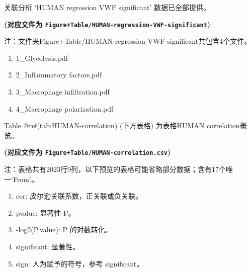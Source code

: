 \documentclass[
  ignorenonframetext,
]{beamer}
\providecommand{\tightlist}{%
  \setlength{\itemsep}{0pt}\setlength{\parskip}{0pt}}
\begin{document}
\begin{frame}[fragile]{关联分析}
`HUMAN regression VWF significant' 数据已全部提供。

\textbf{(对应文件为
\texttt{Figure+Table/HUMAN-regression-VWF-significant})}

\begin{center}\begin{tcolorbox}[colback=gray!10, colframe=gray!50, width=0.9\linewidth, arc=1mm, boxrule=0.5pt]注：文件夹Figure+Table/HUMAN-regression-VWF-significant共包含4个文件。

\begin{enumerate}\tightlist
\item 1\_Glycolysis.pdf
\item 2\_Inflammatory factors.pdf
\item 3\_Macrophage infiltration.pdf
\item 4\_Macrophage polarization.pdf
\end{enumerate}\end{tcolorbox}
\end{center}

\begin{center}\vspace{1.5cm}\end{center}

\begin{center}\vspace{1.5cm}\end{center}

Table @ref(tab:HUMAN-correlation) (下方表格) 为表格HUMAN
correlation概览。

\textbf{(对应文件为 \texttt{Figure+Table/HUMAN-correlation.csv})}

\begin{center}\begin{tcolorbox}[colback=gray!10, colframe=gray!50, width=0.9\linewidth, arc=1mm, boxrule=0.5pt]注：表格共有2023行9列，以下预览的表格可能省略部分数据；含有17个唯一`From'。
\end{tcolorbox}
\end{center}
\begin{center}\begin{tcolorbox}[colback=gray!10, colframe=gray!50, width=0.9\linewidth, arc=1mm, boxrule=0.5pt]\begin{enumerate}\tightlist
\item cor:  皮尔逊关联系数，正关联或负关联。
\item pvalue:  显著性 P。
\item -log2(P.value):  P 的对数转化。
\item significant:  显著性。
\item sign:  人为赋予的符号，参考 significant。
\end{enumerate}\end{tcolorbox}
\end{center}


\end{frame}
\end{document}
